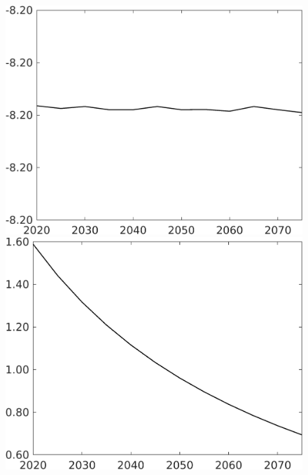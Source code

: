 \begin{figure}[h!!]
\begin{minipage}[]{0.32\textwidth}
	\end{minipage}	
	\begin{minipage}[]{0.32\textwidth}
		\includegraphics[width=1\textwidth]{../../codding_model/own_basedOnFried/optimalPol_010922_revision/figures/all_13Sept22/CompTaul_LFBAUPer_Reg0_hh_spillover0_nsk1_xgr0_sep1_countec0_GovRev1_etaa0.79.png}
	\end{minipage}	
	\begin{minipage}[]{0.32\textwidth}
		\includegraphics[width=1\textwidth]{../../codding_model/own_basedOnFried/optimalPol_010922_revision/figures/all_13Sept22/CompTaul_LFBAUPer_Reg0_sff_spillover0_nsk1_xgr0_sep1_countec0_GovRev1_etaa0.79.png}

\end{minipage}
\end{figure}
